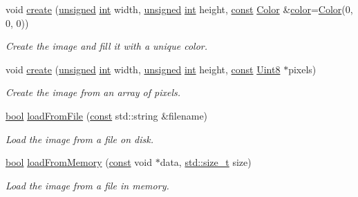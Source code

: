 \begin{DoxyCompactItemize}
void \hyperlink{classsf_1_1_image_a2a67930e2fd9ad97cf004e918cf5832b}{create} (\hyperlink{curses_8priv_8h_aca40206900cfc164654362fa8d4ad1e6}{unsigned} \hyperlink{term__entry_8h_ad65b480f8c8270356b45a9890f6499ae}{int} width, \hyperlink{curses_8priv_8h_aca40206900cfc164654362fa8d4ad1e6}{unsigned} \hyperlink{term__entry_8h_ad65b480f8c8270356b45a9890f6499ae}{int} height, \hyperlink{term__entry_8h_a57bd63ce7f9a353488880e3de6692d5a}{const} \hyperlink{classsf_1_1_color}{Color} \&\hyperlink{_entity_8cpp_a864889304a90873adb9c6e289a54bcf4}{color}=\hyperlink{classsf_1_1_color}{Color}(0, 0, 0))
\begin{DoxyCompactList}\small\item\em Create the image and fill it with a unique color. \end{DoxyCompactList}\item 
void \hyperlink{classsf_1_1_image_a1c2b960ea12bdbb29e80934ce5268ebf}{create} (\hyperlink{curses_8priv_8h_aca40206900cfc164654362fa8d4ad1e6}{unsigned} \hyperlink{term__entry_8h_ad65b480f8c8270356b45a9890f6499ae}{int} width, \hyperlink{curses_8priv_8h_aca40206900cfc164654362fa8d4ad1e6}{unsigned} \hyperlink{term__entry_8h_ad65b480f8c8270356b45a9890f6499ae}{int} height, \hyperlink{term__entry_8h_a57bd63ce7f9a353488880e3de6692d5a}{const} \hyperlink{namespacesf_a4ef3d630785c4f296f9b4f274c33d78e}{Uint8} $\ast$pixels)
\begin{DoxyCompactList}\small\item\em Create the image from an array of pixels. \end{DoxyCompactList}\item 
\hyperlink{term__entry_8h_a002004ba5d663f149f6c38064926abac}{bool} \hyperlink{classsf_1_1_image_a9e4f2aa8e36d0cabde5ed5a4ef80290b}{load\-From\-File} (\hyperlink{term__entry_8h_a57bd63ce7f9a353488880e3de6692d5a}{const} std\-::string \&filename)
\begin{DoxyCompactList}\small\item\em Load the image from a file on disk. \end{DoxyCompactList}\item 
\hyperlink{term__entry_8h_a002004ba5d663f149f6c38064926abac}{bool} \hyperlink{classsf_1_1_image_aaa6c7afa5851a51cec6ab438faa7354c}{load\-From\-Memory} (\hyperlink{term__entry_8h_a57bd63ce7f9a353488880e3de6692d5a}{const} void $\ast$data, \hyperlink{nc__alloc_8h_a7b60c5629e55e8ec87a4547dd4abced4}{std\-::size\-\_\-t} size)
\begin{DoxyCompactList}\small\item\em Load the image from a file in memory. \end{DoxyCompactList}\item 

\end{DoxyCompactItemize}
